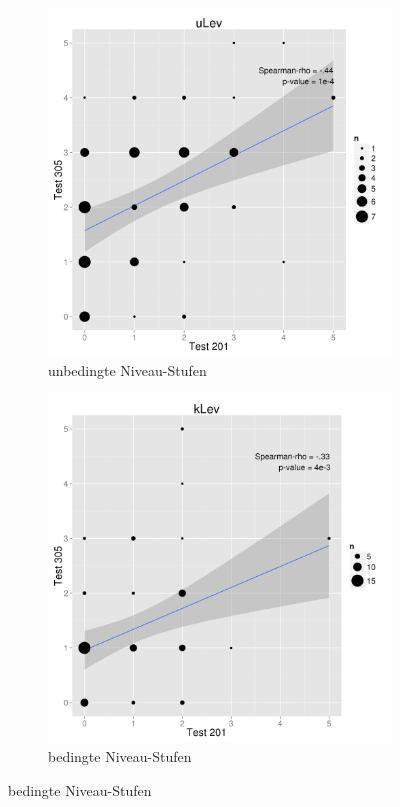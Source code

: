 \begin{figure}[htbp]
\ContinuedFloat %
\centering
\begin{subfigure}{0.49\textwidth}
  \includegraphics[width=1.0\linewidth]{graphics/cor201305u.png}
  \caption{unbedingte Niveau-Stufen}
  \label{fig:cor201305k}
\end{subfigure}
\begin{subfigure}{0.49\textwidth}
  \includegraphics[width=1.0\linewidth]{graphics/cor201305k.png}
  \caption{bedingte Niveau-Stufen}
  \label{fig:cor201305u}
\end{subfigure}
\end{figure}
